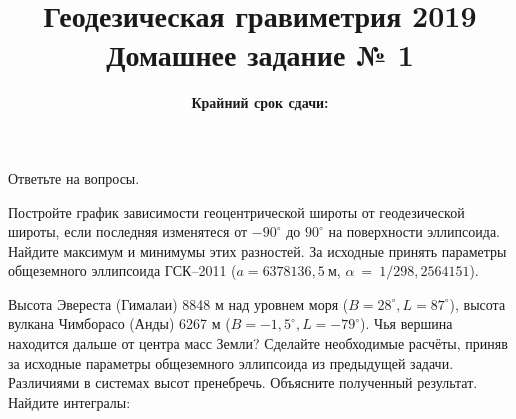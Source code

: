 \documentclass[a4paper,addpoints]{exam}
\title{{\Large Геодезическая гравиметрия 2019}\\ 
    {\bf\Large Домашнее задание № 1}}
\author{}
\date{\normalsize\bf Крайний срок сдачи: \DTMusedate{deadline}}
\theoremstyle{remark}
\renewcommand{\phi}{\ensuremath{\varphi}}
\renewcommand{\theta}{\vartheta}
\begin{document}
\maketitle
\thispagestyle{empty}
\begin{questions}
    \question[1] Ответьте на вопросы.
    \question[2] Постройте график зависимости геоцентрической широты от геодезической широты, 
    если последняя изменятеся от $-90^\circ$ до $90^\circ$ на
    поверхности эллипсоида. Найдите максимум и минимумы этих разностей. За исходные принять параметры общеземного эллипсоида ГСК--2011 
    ($a = 6378136,5\ \text{м}$, $\alpha~=~1/298,2564151$).

    \question[1] Высота Эвереста (Гималаи) 8848 м над уровнем моря ($B = 28^\circ, L = 87^\circ$), 
    высота вулкана Чимборасо (Анды) 6267 м ($B = -1,5^\circ, L = -79^\circ$). Чья вершина находится дальше от
    центра масс Земли? 
    Сделайте необходимые расчёты, приняв за исходные параметры общеземного эллипсоида из предыдущей
    задачи. Различиями в системах высот пренебречь. Объясните полученный результат.
    \question[1] Найдите интегралы:
        \begin{parts}

\end{parts}
\end{questions}
\end{document}
